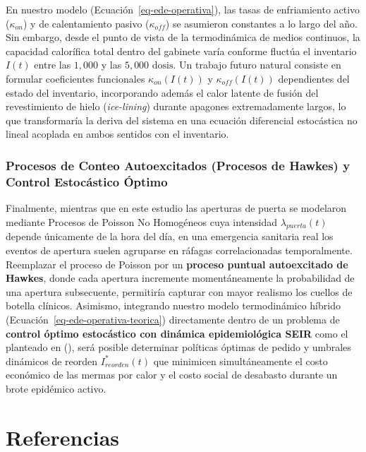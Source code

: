 \documentclass[
  spanish,
  letterpaper,
  DIV=11,
  numbers=noendperiod]{scrreprt}
\theoremstyle{plain}
\theoremstyle{plain}
\theoremstyle{plain}
\theoremstyle{definition}
\theoremstyle{remark}
\begin{document}
En nuestro modelo (Ecuación~\ref{eq-ede-operativa}), las tasas de
enfriamiento activo (\(\kappa_{on}\)) y de calentamiento pasivo
(\(\kappa_{off}\)) se asumieron constantes a lo largo del año. Sin
embargo, desde el punto de vista de la termodinámica de medios
continuos, la capacidad calorífica total dentro del gabinete varía
conforme fluctúa el inventario \(I(t)\) entre las \(1,000\) y las
\(5,000\text{ dosis}\). Un trabajo futuro natural consiste en formular
coeficientes funcionales \(\kappa_{on}(I(t))\) y \(\kappa_{off}(I(t))\)
dependientes del estado del inventario, incorporando además el calor
latente de fusión del revestimiento de hielo (\emph{ice-lining}) durante
apagones extremadamente largos, lo que transformaría la deriva del
sistema en una ecuación diferencial estocástica no lineal acoplada en
ambos sentidos con el inventario.

\subsection{Procesos de Conteo Autoexcitados (Procesos de Hawkes) y
Control Estocástico
Óptimo}\label{procesos-de-conteo-autoexcitados-procesos-de-hawkes-y-control-estocuxe1stico-uxf3ptimo}

Finalmente, mientras que en este estudio las aperturas de puerta se
modelaron mediante Procesos de Poisson No Homogéneos cuya intensidad
\(\lambda_{puerta}(t)\) depende únicamente de la hora del día, en una
emergencia sanitaria real los eventos de apertura suelen agruparse en
ráfagas correlacionadas temporalmente. Reemplazar el proceso de Poisson
por un \textbf{proceso puntual autoexcitado de Hawkes}, donde cada
apertura incremente momentáneamente la probabilidad de una apertura
subsecuente, permitiría capturar con mayor realismo los cuellos de
botella clínicos. Asimismo, integrando nuestro modelo termodinámico
híbrido (Ecuación~\ref{eq-ede-operativa-teorica}) directamente dentro de
un problema de \textbf{control óptimo estocástico con dinámica
epidemiológica SEIR} como el planteado en
(), será posible
determinar políticas óptimas de pedido y umbrales dinámicos de reorden
\(I_{reorden}^*(t)\) que minimicen simultáneamente el costo económico de
las mermas por calor y el costo social de desabasto durante un brote
epidémico activo.


\chapter*{Referencias}\label{referencias}
\end{document}
